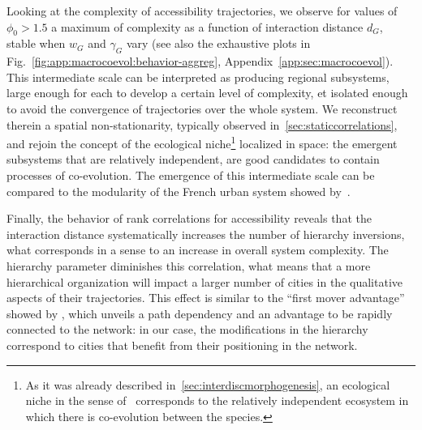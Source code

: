 Looking at the complexity of accessibility trajectories, we observe for values of $\phi_0 > 1.5$ a maximum of complexity as a function of interaction distance $d_G$, stable when $w_G$ and $\gamma_G$ vary (see also the exhaustive plots in Fig.~\ref{fig:app:macrocoevol:behavior-aggreg}, Appendix~\ref{app:sec:macrocoevol}). This intermediate scale can be interpreted as producing regional subsystems, large enough for each to develop a certain level of complexity, et isolated enough to avoid the convergence of trajectories over the whole system. We reconstruct therein a spatial non-stationarity, typically observed in~\ref{sec:staticcorrelations}, and rejoin the concept of the ecological niche\footnote{As it was already described in~\ref{sec:interdiscmorphogenesis}, an ecological niche in the sense of~\cite{holland2012signals} corresponds to the relatively independent ecosystem in which there is co-evolution between the species.} localized in space: the emergent subsystems that are relatively independent, are good candidates to contain processes of co-evolution. The emergence of this intermediate scale can be compared to the modularity of the French urban system showed by~\cite{berroir2017systemes}.



Finally, the behavior of rank correlations for accessibility reveals that the interaction distance systematically increases the number of hierarchy inversions, what corresponds in a sense to an increase in overall system complexity. The hierarchy parameter diminishes this correlation, what means that a more hierarchical organization will impact a larger number of cities in the qualitative aspects of their trajectories. This effect is similar to the ``first mover advantage'' showed by \cite{levinson2011does}, which unveils a path dependency and an advantage to be rapidly connected to the network: in our case, the modifications in the hierarchy correspond to cities that benefit from their positioning in the network.





















